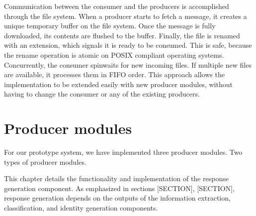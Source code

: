 Communication between the consumer and the producers is accomplished through the file system. When a producer starts to fetch a message, it creates a unique temporary buffer on the file system. Once the message is fully downloaded, its contents are flushed to the buffer. Finally, the file is renamed with an extension, which signals it is ready to be consumed. This is safe, because the rename operation is atomic on POSIX compliant operating systems. Concurrently, the consumer spinwaits for new incoming files. If multiple new files are available, it processes them in FIFO order. This approach allows the implementation to be extended easily with new producer modules, without having to change the consumer or any of the existing producers.

\section{Producer modules}
For our prototype system, we have implemented three producer modules. 
Two types of producer modules.


This chapter details the functionality and implementation of the response generation component. As emphasized in sections [SECTION], [SECTION], response generation depends on the outputs of the information extraction, classification, and identity generation components. 

